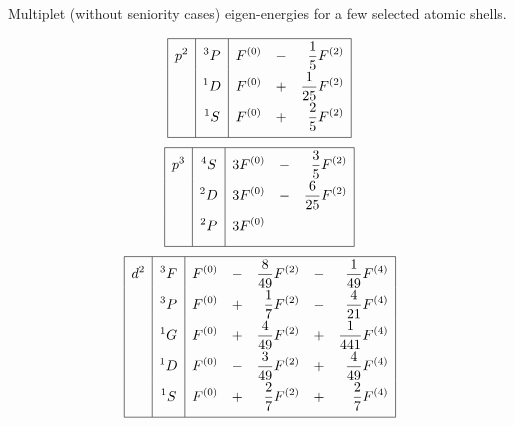 \clearpage
\begin{table}
\caption{Multiplet (without seniority cases) eigen-energies for a few selected atomic shells.}
\label{table:eig}
\vspace{1em}
\begin{minipage}{0.5\textwidth}
\begin{equation*}
\renewcommand{\arraystretch}{1.8}
\begin{array}{|>{\displaystyle}c|>{\displaystyle}c|>{\displaystyle}r >{\displaystyle}c >{\displaystyle}r|}
\hline
p^2 & ^3P & F^{(0)} & - & \frac{1}{5} F^{(2)} \\
    & ^1D & F^{(0)} & + & \frac{1}{25} F^{(2)} \\
    & ^1S & F^{(0)} & + & \frac{2}{5} F^{(2)} \\[0.5em]
\hline
\end{array}
\end{equation*}
\begin{equation*}
\renewcommand{\arraystretch}{1.8}
\begin{array}{|>{\displaystyle}c|>{\displaystyle}c|>{\displaystyle}r >{\displaystyle}c >{\displaystyle}r|}
\hline
p^3 & ^4S & 3 F^{(0)} & - & \frac{3}{5} F^{(2)} \\
    & ^2D & 3 F^{(0)} & - & \frac{6}{25} F^{(2)} \\
    & ^2P & 3 F^{(0)} &   &  \\[0.5em]
\hline
\end{array}
\end{equation*}
\begin{equation*}
\renewcommand{\arraystretch}{1.8}
\begin{array}{|>{\displaystyle}c|>{\displaystyle}c|>{\displaystyle}r >{\displaystyle}c >{\displaystyle}r >{\displaystyle}c >{\displaystyle}r|}
\hline
d^2 & ^3F & F^{(0)} & - & \frac{8}{49} F^{(2)} & - & \frac{1}{49} F^{(4)} \\
    & ^3P & F^{(0)} & + & \frac{1}{7} F^{(2)} & - & \frac{4}{21} F^{(4)} \\
    & ^1G & F^{(0)} & + & \frac{4}{49} F^{(2)} & + & \frac{1}{441} F^{(4)} \\
    & ^1D & F^{(0)} & - & \frac{3}{49} F^{(2)} & + & \frac{4}{49} F^{(4)} \\
    & ^1S & F^{(0)} & + & \frac{2}{7} F^{(2)} & + & \frac{2}{7} F^{(4)} \\[0.5em]
\hline
\end{array}
\end{equation*}
\end{minipage}

\end{table}
